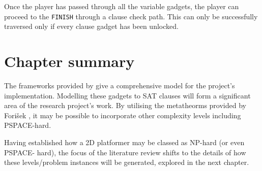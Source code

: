 \documentclass[11pt, a4paper, oneside]{report} %
\begin{document}
Once the player has passed through all the variable gadgets, the player can proceed to the
\texttt{FINISH} through a clause check path. This can only be successfully traversed only if every
clause gadget has been unlocked.






\section{Chapter summary}

The frameworks provided by \cite{Aloupis2012} give a comprehensive model for the project's
implementation. Modelling these gadgets to SAT clauses will form a significant area of the research
project's work. By utilising the metatheorms provided by Fori\v{s}ek \cite{DBLP:conf/fun/Forisek10},
it may be possible to incorporate other complexity levels including PSPACE-hard.

Having established how a 2D platformer may be classed as NP-hard (or even PSPACE-
hard), the focus of the literature review shifts to the details of how these levels/problem
instances will be generated, explored in the next chapter.




\end{document}
